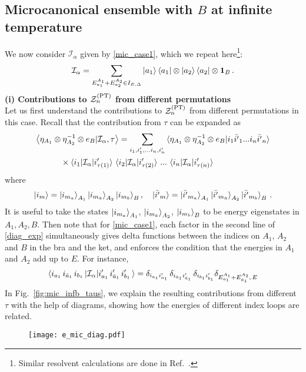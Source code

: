 \documentclass[a4paper,11pt]{article}
\newcommand\vev[1]{{\ensuremath{\left\langle{#1}\right\rangle}}}
\newcommand{\be}{\begin{equation}}
\newcommand{\ee}{\end{equation}}
\newcommand{\bea}{\begin{eqnarray}}
\newcommand{\eea}{\end{eqnarray}}
\newcommand\al{{\alpha}}
\newcommand\sI{{\ensuremath{{\mathcal I}}}}
\newcommand\sZ{{\mathcal Z}}
\begin{document}
\begin{enumerate}
\begin{appendix}
\subsection{Microcanonical ensemble with $B$ at infinite temperature}
\label{app:mic_b}
We now consider $\sI_{\al}$ given by \eqref{mic_case1}, which we repeat here\footnote{Similar resolvent calculations are done in Ref.~\cite{hassan_forthcoming}.}: 
\be \label{mic_case1_repeat}
\sI_{\al} = \sum_{E^{A_1}_{a_1} + E^{A_2}_{a_2} \in I_{E, \Delta}} \ket{a_1}\bra{a_1} \otimes \ket{a_2}\bra{a_2} \otimes \mathbf{1}_B\, . 
\ee
\textbf{(i) Contributions to $\sZ_n^{\rm (PT)}$ from different permutations}\\
Let us first understand the contributions to $\sZ_n^{\rm (PT)}$ from different permutations in this case. Recall that the contribution from $\tau$ can be expanded as 
\bea \label{diag_exp}
\begin{split}
&\vev{\eta_{A_1} \otimes \eta^{-1}_{A_2} \otimes e_{B} | \sI_\al , \tau} = \sum_{i_1, i'_1, ... i_n, i'_n} \braket{\eta_{A_1} \otimes \eta^{-1}_{A_2} \otimes e_{B}|i_1 \bar{i'}_1 ... i_n \bar{i'}_n} \\
& \quad \quad \quad \times \braket{ i_1|\sI_{\al}|i'_{\tau(1)}} \, \braket{ i_2|\sI_{\al}|i'_{\tau(2)}} \, ... \, \braket{ i_n|\sI_{\al}|i'_{\tau(n)}}
\end{split}
\eea
where 
\be 
 \ket{i_m} = \ket{i_{m_a}}_{A_1} \ket{i_{m_{\bar{a}}}}_{A_2} \ket{i_{m_b}}_B, \quad \ket{\bar{i'}_m} = \ket{\bar{i'}_{m_a}}_{A_1} \ket{\bar{i'}_{m_{\bar{a}}}}_{A_2} \ket{\bar{i'}_{m_b}}_B \, . 
\ee
It is useful to take the states $\ket{i_{m_a}}_{A_1}$, $\ket{i_{m_{\bar{a}}}}_{A_2}$, $\ket{i_{m_b}}_B$ to be energy eigenstates in $A_1, A_2, B$. Then note that for \eqref{mic_case1}, each factor in the second line of \eqref{diag_exp} simultaneously gives delta functions between the indices on $A_1$, $A_2$ and $B$ in the bra and the ket, and enforces the condition that the energies in $A_1$ and $A_2$ add up to $E$. For instance, 
\be 
\braket{ i_{a_1} \, i_{\bar{a}_1}\, i_{b_1}\, |\sI_{\al}| i'_{a_1} \, i'_{\bar{a}_1}\, i'_{b_1}\,} = \delta_{i_{a_1} i'_{a_1}}\, \delta_{i_{\bar{a}_1} i'_{\bar{a}_1}}\, \delta_{i_{b_1} i'_{b_1}} \delta_{E^{A_1}_{a_1}+ E^{A_2}_{\bar{a}_1}, \, E}
\ee
In Fig.~\ref{fig:mic_infb_taus}, we explain the resulting contributions from different $\tau$ with the help of diagrams, showing how the energies of different index loops are related. 
\begin{figure}[] 
\centering
\texttt{[image: e\_mic\_diag.pdf]}


\end{figure}
\end{appendix}
\end{enumerate}
\end{document}
